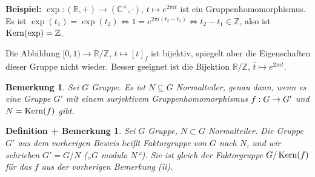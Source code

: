 \documentclass[a4paper,10pt,german]{scrbook}
\theoremstyle{saetze}
\theoremstyle{definitionen}
\newtheorem{DefBem}[Def]{Definition + Bemerkung}
\newtheorem{Bem}[Def]{Bemerkung}
\begin{document}
\textbf{Beispiel:} $\exp:(\mathbb R, +) \to (\mathbb C^\times, \cdot)$, $t\mapsto e^{2\pi i t}$ ist ein Gruppenhomomorphismus. Es ist $\exp(t_1) = \exp(t_2) \iff 1 = e^{2\pi i(t_2-t_1)} \iff t_2 - t_1 \in \mathbb Z$, also ist $\mathop{\rm Kern}\nolimits(\exp) = \mathbb Z$.

Die Abbildung $[0,1)\to\mathbb R/\mathbb Z$, $t \mapsto [t]_f$ ist bijektiv, spiegelt aber die Eigenschaften dieser Gruppe nicht wieder. Besser geeignet ist die Bijektion $\mathbb R/\mathbb Z$, $\bar t \mapsto e^{2\pi i t}$.

\begin{Bem}
    Sei $G$ Gruppe. Es ist $N \subseteq G$ Normalteiler, genau dann, wenn es eine Gruppe $G'$ mit einem surjektivem Gruppenhomomorphismus $f:G \rightarrow G'$ und $N
    =\mathop{\rm Kern}\nolimits(f)$ gibt. 
    
\end{Bem}
    
\begin{DefBem}
    Sei $G$ Gruppe, $N\subset G$ Normalteiler. Die Gruppe $G'$ aus dem vorherigen Beweis heißt Faktorgruppe von $G$ nach $N$, und wir schrieben $G' = G/N$ („$G$ modulo $N$“). Sie ist gleich der Faktorgruppe $G/\mathop{\rm Kern}\nolimits(f)$ für das $f$ aus der  vorherigen Bemerkung (ii).
\end{DefBem}
\end{document}
